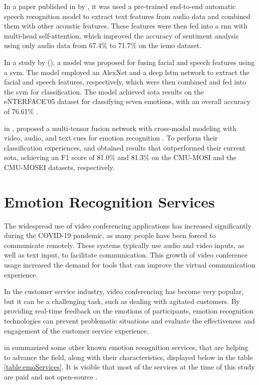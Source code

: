 In a paper published in \citeyear{Lu2020} by \citeauthor{Lu2020}, it was used a pre-trained end-to-end automatic speech recognition model to extract text features from audio data and combined them with other acoustic features. These features were then fed into a \ac{rnn} with multi-head self-attention, which improved the accuracy of sentiment analysis using only audio data from 67.4\% to 71.7\% on the \ac{iemo} dataset.

In a study by \citeauthor{Handa2021} (\citeyear{Handa2021}), a model was proposed for fusing facial and speech features using a \ac{svm}. The model employed an AlexNet and a deep \ac{lstm} network to extract the facial and speech features, respectively, which were then combined and fed into the \ac{svm} for classification. The model achieved \ac{sota} results on the eNTERFACE’05 dataset for classifying seven emotions, with an overall accuracy of 76.61\% \cite{Handa2021}.

\citeauthor{Yan2021} in \citeyear{Yan2021}, proposed a multi-tensor fusion network with cross-modal modeling with video, audio, and text cues for emotion recognition \cite{Yan2021}. To perform their classification experiences, and obtained results that outperformed their current \ac{sota}, achieving an F1 score of 81.0\% and 81.3\% on the CMU-MOSI and the CMU-MOSEI datasets, respectively.

\section{Emotion Recognition Services}

The widespread use of video conferencing applications has increased significantly during the COVID-19 pandemic, as many people have been forced to communicate remotely. These systems typically use audio and video inputs, as well as text input, to facilitate communication. This growth of video conference usage increased the demand for tools that can improve the virtual communication experience.

In the customer service industry, video conferencing has become very popular, but it can be a challenging task, such as dealing with agitated customers. By providing real-time feedback on the emotions of participants, emotion recognition technologies can prevent problematic situations and evaluate the effectiveness and engagement of the customer service experience.

\citeauthor{Buitelaar2018} in \citeyear{Buitelaar2018} summarized some other known emotion recognition services, that are helping to advance the field, along with their characteristics, displayed below in the table \ref{table:emoServices}. It is visible that most of the services at the time of this study are paid and not open-source \cite{Buitelaar2018}.

